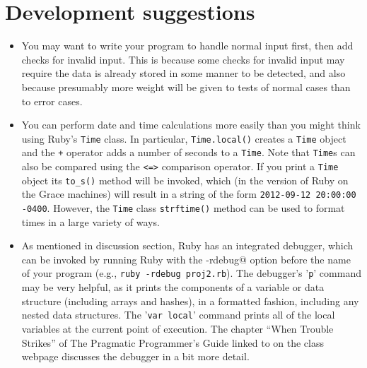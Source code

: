 \documentclass[11pt]{article}
\begin{document}
    \vspace{-2mm}

  \section{Development suggestions}

    \begin{itemize}

      \addtolength{\itemsep}{-1mm}

      \item You may want to write your program to handle normal input first,
            then add checks for invalid input.  This is because some checks
            for invalid input may require the data is already stored in some
            manner to be detected, and also because presumably more weight
            will be given to tests of normal cases than to error cases.

      \item You can perform date and time calculations more easily than you
            might think using Ruby's \texttt{Time} class.  In particular,
            \texttt{Time.local()} creates a \texttt{Time} object and the
            \texttt{+} operator adds a number of seconds to a \texttt{Time}.
            Note that \texttt{Time}s can also be compared using the
            \texttt{<=>} comparison operator.  If you print a \texttt{Time}
            object its \texttt{to\_s()} method will be invoked, which (in
            the version of Ruby on the Grace machines) will result in a
            string of the form \texttt{2012-09-12 20:00:00 -0400}.  However,
            the \texttt{Time} class \texttt{strftime()} method can be used
            to format times in a large variety of ways.

      \item As mentioned in discussion section, Ruby has an integrated
            debugger, which can be invoked by running Ruby with the
            \verb@-rdebug@ option before the name of your program (e.g.,
            \texttt{ruby -rdebug proj2.rb}).  The debugger's '\texttt{p}'
            command may be very helpful, as it prints the components of a
            variable or data structure (including arrays and hashes), in a
            formatted fashion, including any nested data structures.  The
            '\texttt{var local}' command prints all of the local variables
            at the current point of execution.  The chapter ``When Trouble
            Strikes'' of The Pragmatic Programmer's Guide linked to on the
            class webpage discusses the debugger in a bit more detail.

    \end{itemize}
\end{document}
